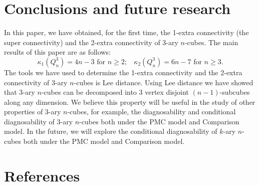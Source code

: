 \documentclass[preprint,number,12pt]{elsarticle}
\begin{document}
\section{Conclusions and future research}
In this paper, we have obtained, for the first time, the 1-extra connectivity (the super connectivity) and the 2-extra connectivity of 3-ary $n$-cubes.
The main results of this paper are as follows: $$\kappa_1(Q_{n}^{3}) = 4n-3 \mbox{ for } n\ge 2; \ \ \ \  \kappa_2(Q_{n}^{3}) = 6n-7 \mbox{ for }n\ge 3.$$
The tools we have used to determine the 1-extra connectivity and the 2-extra connectivity of 3-ary $n$-cubes is Lee distance.  Using Lee distance we have showed that 3-ary $n$-cubes can be decomposed into 3 vertex disjoint $(n-1)$-subcubes along any dimension. We believe this property will be useful in the study of other properties of 3-ary $n$-cubes, for example,   the diagnosability and conditional diagnosability of 3-ary $n$-cubes both  under the PMC model and Comparison model. In the future, we will explore the conditional diagnosability of $k$-ary $n$-cubes both under the PMC model and Comparison model.









\section*{References}


\end{document}
